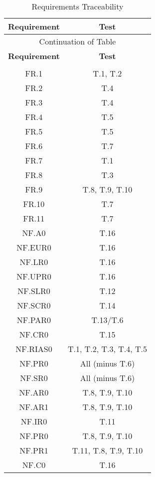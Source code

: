 \documentclass[12pt, titlepage]{article}
\begin{document}
\begin{longtable}[H] {|c|c|}
\hline
\textbf{Requirement} & \textbf{Test} \\
\hline
\endfirsthead

\hline
\multicolumn{2}{|c|}{Continuation of Table}\\
\hline
\textbf{Requirement} & \textbf{Test} \\
\hline
\endhead

\hline
\endfoot

\hline
\multicolumn{2}{| c |}{End of Table}\\
\hline
\caption{Requirements Traceability}
\label{tab:Traceability}
\endlastfoot


FR.1 & T.1, T.2\\
FR.2 & T.4\\
FR.3 & T.4\\
FR.4 & T.5\\
FR.5 & T.5\\
FR.6 & T.7\\
FR.7 & T.1\\
FR.8 & T.3\\
FR.9 & T.8, T.9, T.10\\
FR.10 & T.7\\
FR.11 & T.7\\

\pagebreak
NF.A0 & T.16 \\
NF.EUR0 & T.16 \\
NF.LR0 & T.16 \\
NF.UPR0 & T.16 \\
NF.SLR0 & T.12 \\ 
NF.SCR0 & T.14 \\
NF.PAR0 & T.13/T.6 \\
NF.CR0 & T.15 \\
NF.RIAS0 & T.1, T.2, T.3, T.4, T.5\\
NF.PR0 & All (minus T.6) \\
NF.SR0 & All (minus T.6) \\ 
NF.AR0 & T.8, T.9, T.10 \\
NF.AR1 & T.8, T.9, T.10 \\
NF.IR0 & T.11 \\
NF.PR0 & T.8, T.9, T.10 \\
NF.PR1 & T.11, T.8, T.9, T.10 \\
NF.C0 & T.16 \\

\end{longtable}

\newpage
\end{document}

